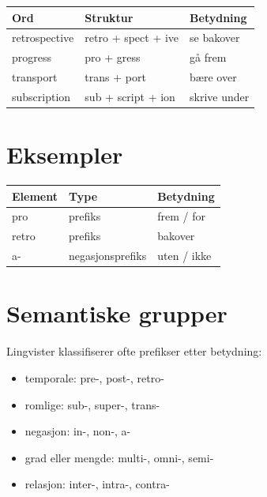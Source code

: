 \documentclass{article}
\begin{document}
\begin{tabular}{lll}
\toprule
Ord & Struktur & Betydning \\
\midrule
retrospective & retro + spect + ive & se bakover \\
progress & pro + gress & gå frem \\
transport & trans + port & bære over \\
subscription & sub + script + ion & skrive under \\
\bottomrule
\end{tabular}

\section{Eksempler}

\begin{tabular}{lll}
\toprule
Element & Type & Betydning \\
\midrule
pro & prefiks & frem / for \\
retro & prefiks & bakover \\
a- & negasjonsprefiks & uten / ikke \\
\bottomrule
\end{tabular}

\section{Semantiske grupper}

Lingvister klassifiserer ofte prefikser etter betydning:

\begin{itemize}
\item temporale: pre-, post-, retro-
\item romlige: sub-, super-, trans-
\item negasjon: in-, non-, a-
\item grad eller mengde: multi-, omni-, semi-
\item relasjon: inter-, intra-, contra-
\end{itemize}
\end{document}
